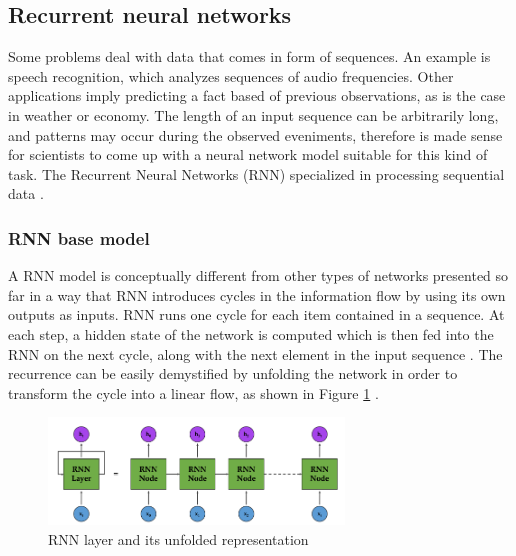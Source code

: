\subsection{Recurrent neural networks}
\label{subsec:ch3sec3subsec4}

Some problems deal with data that comes in form of sequences. An example is speech recognition, which analyzes sequences of audio frequencies. Other applications imply predicting a fact based of previous observations, as is the case in weather or economy. The length of an input sequence can be arbitrarily long, and patterns may occur during the observed eveniments, therefore is made sense for scientists to come up with a neural network model suitable for this kind of task. The Recurrent Neural Networks (RNN) specialized in processing sequential data \cite{rnn}.

\subsubsection{RNN base model}
\label{subsubsec:ch3sec3subsec4subsubsec1}

A RNN model is conceptually different from other types of networks presented so far in a way that RNN introduces cycles in the information flow by using its own outputs as inputs. RNN runs one cycle for each item contained in a sequence. At each step, a hidden state of the network is computed which is then fed into the RNN on the next cycle, along with the next element in the input sequence  \cite{rnn}. The recurrence can be easily demystified by unfolding the network in order to transform the cycle into a linear flow, as shown in Figure \ref{FigRNN} \cite{rnn_cells_pic}. 

\begin{figure}[htbp]
    \centering
        \includegraphics[width=0.7\textwidth]{figures/rnn_layer.PNG}
    \caption{RNN layer and its unfolded representation \cite{rnn_cells_pic}}
    \label{FigRNN}
\end{figure}

